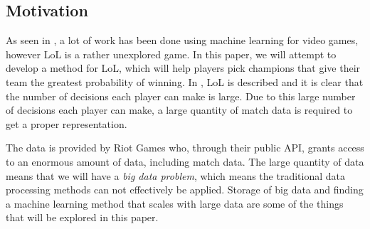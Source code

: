 \FloatBarrier
\subsection{Motivation}\label{sec:motivation}
As seen in , a lot of work has been done using machine learning for video games, however LoL is a rather unexplored game. 
In this paper, we will attempt to develop a method for LoL, which will help players pick champions that give their team the greatest probability of winning. In , LoL is described and it is clear that the number of decisions each player can make is large. Due to this large number of decisions each player can make, a large quantity of match data is required to get a proper representation. 

The data is provided by Riot Games who, through their public API, grants access to an enormous amount of data, including match data.
The large quantity of data means that we will have a \emph{big data problem}, which means the traditional data processing methods can not effectively be applied. Storage of big data and finding a machine learning method that scales with large data are some of the things that will be explored in this paper.



